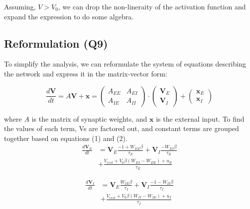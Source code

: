 \documentclass[10pt,twocolumn]{article}
\begin{document}
Assuming, $V > V_0$, we can drop the non-lineraity of the activation
function and expand the expression to do some algebra.

\subsection{Reformulation (Q9)}
To simplify the analysis, we can reformulate the system
of equations describing the network and
express it in the matrix-vector form:

$$
    \frac{d\textbf{V}}{dt}
    = A\textbf{V} + \textbf{x}
    =
    \begin{pmatrix}
        A_{EE} & A_{EI} \\
        A_{IE} & A_{II}
    \end{pmatrix}
    \cdot \begin{pmatrix} \textbf{V}_E \\ \textbf{V}_I \end{pmatrix}
    + \begin{pmatrix} \textbf{x}_E \\ \textbf{x}_I \end{pmatrix}
$$

where $A$ is the matrix of synaptic weights,
and $\textbf{x}$ is the external input.
To find the values of each term, Vs are factored out, and
constant terms are grouped together based on equations (1) and (2).
$$
    \begin{align*}
        \frac{d\textbf{V}_E}{dt} & = \textbf{V}_E \boxed{\frac{-1 + W_{EE}\beta}{\tau_E}}
        + \textbf{V}_I \boxed{\frac{-W_{EI}\beta}{\tau_E}}                                           \\
                                 & + \boxed{\frac{V_{rest} + V_0\beta(W_{EI}-W_{EE}) + u_E}{\tau_E}}
    \end{align*}
$$

$$
    \begin{align*}
        \frac{d\textbf{V}_I}{dt} & = \textbf{V}_E\boxed{\frac{W_{IE}\beta}{\tau_I}}
        + \textbf{V}_I\boxed{\frac{-1 - W_{II}\beta}{\tau_I}}                                        \\
                                 & + \boxed{\frac{V_{rest} + V_0\beta(W_{II}-W_{IE}) + u_I}{\tau_I}}
    \end{align*}
$$
\end{document}
